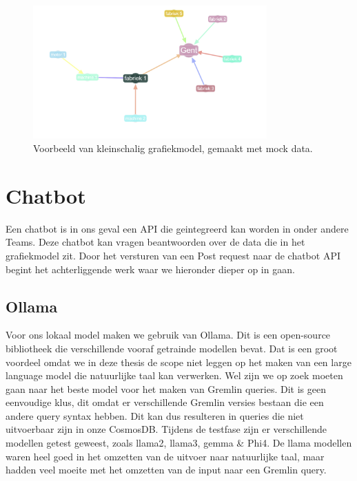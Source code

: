 \begin{figure}[h]
     \centering
     \includegraphics[width=0.8\textwidth]{./img/grapmodel_example.png}
     \caption[Voorbeeld Grafiekmodel.]{\label{fig:graphmodel}Voorbeeld van kleinschalig grafiekmodel, gemaakt met mock data.}
\end{figure}


\section{Chatbot}
Een chatbot is in ons geval een API die geintegreerd kan worden in onder andere Teams. Deze chatbot kan vragen beantwoorden over de data die in het grafiekmodel zit.
Door het versturen van een Post request naar de chatbot API begint het achterliggende werk waar we hieronder dieper op in gaan. 

\subsection{Ollama}
Voor ons lokaal model maken we gebruik van Ollama. Dit is een open-source bibliotheek die verschillende vooraf getrainde modellen bevat. 
Dat is een groot voordeel omdat we in deze thesis de scope niet leggen op het maken van een large language model die natuurlijke taal kan verwerken.
Wel zijn we op zoek moeten gaan naar het beste model voor het maken van Gremlin queries. Dit is geen eenvoudige klus, dit omdat er verschillende Gremlin versies bestaan die een andere query syntax hebben.
Dit kan dus resulteren in queries die niet uitvoerbaar zijn in onze CosmosDB.\@
Tijdens de testfase zijn er verschillende modellen getest geweest, zoals llama2, llama3, gemma \& Phi4.
De llama modellen waren heel goed in het omzetten van de uitvoer naar natuurlijke taal, maar hadden veel moeite met het omzetten van de input naar een Gremlin query.


